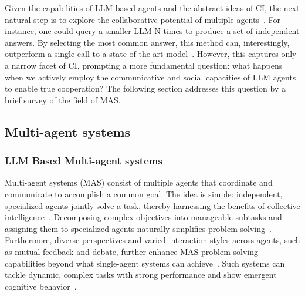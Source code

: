 \documentclass[pdflatex,sn-mathphys-num]{sn-jnl}%
\theoremstyle{thmstyleone}%
\theoremstyle{thmstyletwo}%
\theoremstyle{thmstylethree}%
\begin{document}
Given the capabilities of LLM based agents and the abstract ideas of CI, the next natural step is to explore the collaborative potential of multiple agents~\cite{talebirad2023multi,tran2025multi}. For instance, one could query a smaller LLM N times to produce a set of independent answers. By selecting the most common answer, this method can, interestingly, outperform a single call to a state-of-the-art model~\cite{li2024more}. However, this captures only a narrow facet of CI, prompting a more fundamental question: what happens when we actively employ the communicative and social capacities of LLM agents to enable true cooperation? The following section addresses this question by a brief survey of the field of MAS.

\subsection{Multi-agent systems}
\label{sec:mas}

\subsubsection{LLM Based Multi-agent systems}

Multi-agent systems (MAS) consist of multiple agents that coordinate and communicate to accomplish a common goal. The idea is simple: independent, specialized agents jointly solve a task, thereby harnessing the benefits of collective intelligence~\cite{guo2024large,talebirad2023multi}. Decomposing complex objectives into manageable subtasks and assigning them to specialized agents naturally simplifies problem-solving~\cite{huang2024understanding,hong2024metagpt,khot2022decomposed}. Furthermore, diverse perspectives and varied interaction styles across agents, such as mutual feedback and debate, further enhance MAS problem-solving capabilities beyond what single-agent systems can achieve~\cite{tillmann2025literature,guo2026embodied,fu2023improving}. Such systems can tackle dynamic, complex tasks with strong performance and show emergent cognitive behavior~\cite{duenez2023social,guo2024large}.
\end{document}
